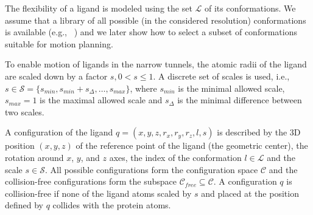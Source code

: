 \documentclass[usletter, 10pt, conference]{ieeeconf} %
\def\C{\mathcal{C}}
\def\CF{\mathcal{C}_{free}}
\def\CFD{{\mathcal{C}^s_{free}}}
\def\smin{s_{min}}
\def\smax{s_{max}}
\def\sdelta{s_{\Delta}}
\def\L{\mathcal{L}}
\def\S{\mathcal{S}}
\begin{document}


The flexibility of a ligand is modeled using the set $\L$ of its conformations.
We assume that a library of all possible (in the considered resolution) conformations is available (e.g., ~\cite{dunbrack}) and we later show how to select a subset of conformations suitable for motion planning.

To enable motion of ligands in the narrow tunnels, the atomic radii of the ligand are scaled down by a factor $s, 0 < s \le 1$.
A discrete set of scales is used, i.e., $s \in \S=\{\smin, \smin+\sdelta, \ldots, \smax\}$, where 
$\smin$ is the minimal allowed scale, $\smax=1$ is the maximal allowed scale and $\sdelta$ is the minimal difference between two scales.

A configuration of the ligand $q=(x,y,z,r_x,r_y,r_z,l,s)$  is described
by the 3D position $(x,y,z)$ of the reference point of the ligand (the geometric center), the rotation around $x$, $y$, and $z$ axes,
the index of the conformation $l\in \L$ and the scale $s \in \S$.
All possible configurations form the configuration space $\C$ and the collision-free configurations
form the subspace $\CF \subseteq \C$.
A configuration $q$ is collision-free if none of the ligand atoms scaled by $s$ and placed at the
position defined by $q$ collides with the protein atoms.
\end{document}
